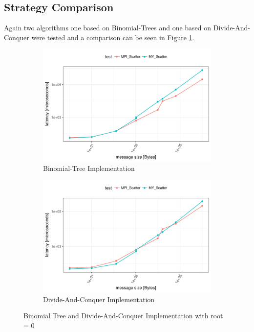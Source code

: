 \subsection{Strategy Comparison}
Again two algorithms one based on Binomial-Trees and one based on Divide-And-Conquer were tested and a comparison can be seen in Figure \ref{fig:scatter:binom_vs_dac}.

\begin{figure}[H]
  \centering
  \begin{subfigure}[b]{0.49\textwidth}
        \includegraphics[width=\textwidth]{../benchmarks/openmpi/binom/scatter_32/runtime.pdf}
        \caption{Binomial-Tree Implementation}
    \end{subfigure}
    \begin{subfigure}[b]{0.49\textwidth}
        \includegraphics[width=\textwidth]{../benchmarks/openmpi/divide_conquer/scatter_32/runtime.pdf}
        \caption{Divide-And-Conquer Implementation}
    \end{subfigure}
    \caption{Binomial Tree and Divide-And-Conquer Implementation with root = 0}
    \label{fig:scatter:binom_vs_dac}
\end{figure}

